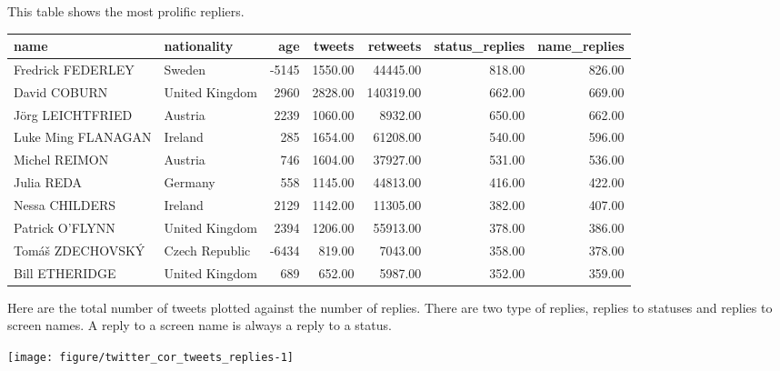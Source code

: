 \documentclass{article}\usepackage[]{graphicx}\usepackage[]{color}
\makeatletter
\def\maxwidth{ %
  \ifdim\Gin@nat@width>\linewidth
    \linewidth
  \else
    \Gin@nat@width
  \fi
}
\newenvironment{knitrout}{}{} %
\makeatother
\begin{document}
This table shows the most prolific repliers. 

\begin{tabular}{llrrrrr}
  \hline
name & nationality & age & tweets & retweets & status\_replies & name\_replies \\ 
  \hline
Fredrick FEDERLEY & Sweden & -5145 & 1550.00 & 44445.00 & 818.00 & 826.00 \\ 
  David COBURN & United Kingdom & 2960 & 2828.00 & 140319.00 & 662.00 & 669.00 \\ 
  Jörg LEICHTFRIED & Austria & 2239 & 1060.00 & 8932.00 & 650.00 & 662.00 \\ 
  Luke Ming FLANAGAN & Ireland & 285 & 1654.00 & 61208.00 & 540.00 & 596.00 \\ 
  Michel REIMON & Austria & 746 & 1604.00 & 37927.00 & 531.00 & 536.00 \\ 
  Julia REDA & Germany & 558 & 1145.00 & 44813.00 & 416.00 & 422.00 \\ 
  Nessa CHILDERS & Ireland & 2129 & 1142.00 & 11305.00 & 382.00 & 407.00 \\ 
  Patrick O'FLYNN & United Kingdom & 2394 & 1206.00 & 55913.00 & 378.00 & 386.00 \\ 
  Tomáš ZDECHOVSKÝ & Czech Republic & -6434 & 819.00 & 7043.00 & 358.00 & 378.00 \\ 
  Bill ETHERIDGE & United Kingdom & 689 & 652.00 & 5987.00 & 352.00 & 359.00 \\ 
   \hline
\end{tabular}


Here are the total number of tweets plotted against the number of replies. There are two type of replies, replies to statuses and replies to screen names. A reply to a screen name is always a reply to a status. 

\begin{knitrout}
\color{fgcolor}

{\centering \texttt{[image: figure/twitter\_cor\_tweets\_replies-1]} 

}



\end{knitrout}
\end{document}
